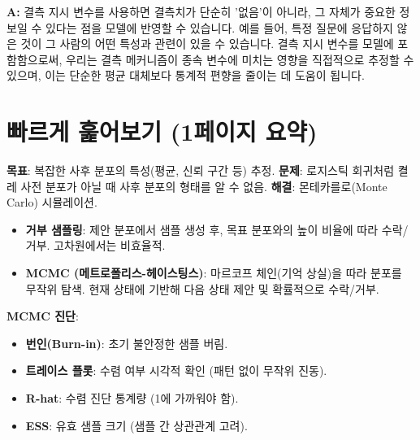 \documentclass[11pt,a4paper]{book}
\providecommand{\newsection}{\section}
\theoremstyle{definition}
\begin{document}
\begin{tcolorbox}[infobox, title={Q: 결측 지시 변수를 사용하는 것이 왜 더 나은 방법인가요?}]
\textbf{A:} 결측 지시 변수를 사용하면 결측치가 단순히 '없음'이 아니라, 그 자체가 중요한 정보일 수 있다는 점을 모델에 반영할 수 있습니다. 예를 들어, 특정 질문에 응답하지 않은 것이 그 사람의 어떤 특성과 관련이 있을 수 있습니다. 결측 지시 변수를 모델에 포함함으로써, 우리는 결측 메커니즘이 종속 변수에 미치는 영향을 직접적으로 추정할 수 있으며, 이는 단순한 평균 대체보다 통계적 편향을 줄이는 데 도움이 됩니다.
\end{tcolorbox}

\newsection{빠르게 훑어보기 (1페이지 요약)}

\begin{summarybox}[title={베이즈 사후 분포 샘플링}]
\textbf{목표}: 복잡한 사후 분포의 특성(평균, 신뢰 구간 등) 추정.
\textbf{문제}: 로지스틱 회귀처럼 켤레 사전 분포가 아닐 때 사후 분포의 형태를 알 수 없음.
\textbf{해결}: 몬테카를로(Monte Carlo) 시뮬레이션.
\begin{itemize}
    \item \textbf{거부 샘플링}: 제안 분포에서 샘플 생성 후, 목표 분포와의 높이 비율에 따라 수락/거부. 고차원에서는 비효율적.
    \item \textbf{MCMC (메트로폴리스-헤이스팅스)}: 마르코프 체인(기억 상실)을 따라 분포를 무작위 탐색. 현재 상태에 기반해 다음 상태 제안 및 확률적으로 수락/거부.
\end{itemize}
\textbf{MCMC 진단}:
\begin{itemize}
    \item \textbf{번인(Burn-in)}: 초기 불안정한 샘플 버림.
    \item \textbf{트레이스 플롯}: 수렴 여부 시각적 확인 (패턴 없이 무작위 진동).
    \item \textbf{R-hat}: 수렴 진단 통계량 (1에 가까워야 함).
    \item \textbf{ESS}: 유효 샘플 크기 (샘플 간 상관관계 고려).
\end{itemize}
\end{summarybox}

\vspace{1em}
\end{document}
